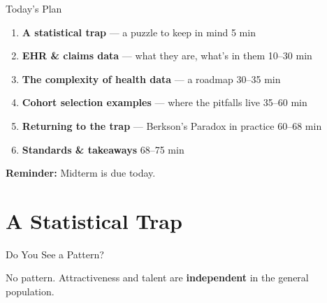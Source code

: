 \documentclass[aspectratio=169,10pt]{beamer}
\begin{document}
\begin{frame}{Today's Plan}
\begin{enumerate}
    \item \textbf{A statistical trap} --- a puzzle to keep in mind \hfill\textcolor{columbiagray}{\scriptsize 5 min}
    \item \textbf{EHR \& claims data} --- what they are, what's in them \hfill\textcolor{columbiagray}{\scriptsize 10--30 min}
    \item \textbf{The complexity of health data} --- a roadmap \hfill\textcolor{columbiagray}{\scriptsize 30--35 min}
    \item \textbf{Cohort selection examples} --- where the pitfalls live \hfill\textcolor{columbiagray}{\scriptsize 35--60 min}
    \item \textbf{Returning to the trap} --- Berkson's Paradox in practice \hfill\textcolor{columbiagray}{\scriptsize 60--68 min}
    \item \textbf{Standards \& takeaways} \hfill\textcolor{columbiagray}{\scriptsize 68--75 min}
\end{enumerate}

\vspace{0.3em}
\textbf{Reminder:} Midterm is due today.
\end{frame}

\section{A Statistical Trap}

\begin{frame}{Do You See a Pattern?}
\vspace{-0.5em}
\begin{center}
\end{center}

\pause
\centering No pattern. Attractiveness and talent are \textbf{independent} in the general population.
\end{frame}
\end{document}
